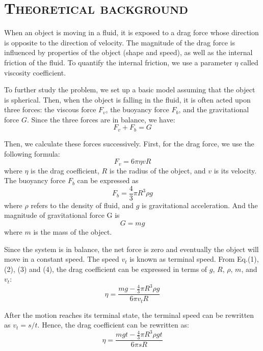 \documentclass[a4paper,12pt]{article}
\begin{document}
\section{\textsc{Theoretical background}}
When an object is moving in a fluid, it is exposed to a drag force whose direction is opposite to the direction of velocity. The magnitude of the drag force is influenced by properties of the object (shape and speed), as well as the internal friction of the fluid. To quantify the internal friction, we use a parameter $\eta$ called viscosity coefficient.
\par To further study the problem, we set up a basic model assuming that the object is spherical. Then, when the object is falling in the fluid, it is often acted upon three forces: the viscous force $F_v$, the buoyancy force $F_b$, and the gravitational force $G$. Since the three forces are in balance, we have:
\begin{equation}
F_v + F_b = G
\end{equation}
\par Then, we calculate these forces successively. First, for the drag force, we use the following formula: 
\begin{equation}
F_v = 6\pi \eta vR
\end{equation}
where $\eta$ is the drag coefficient, $R$ is the radius of the object, and $v$ is its velocity. The buoyancy force $F_b$ can be expressed as
\begin{equation}
F_b = \frac{4}{3}\pi R^3 \rho g
\end{equation}
where $\rho$ refers to the density of fluid, and $g$ is gravitational acceleration. And the magnitude of gravitational force G is
\begin{equation}
G = mg
\end{equation}
where $m$ is the mass of the object.
\par Since the system is in balance, the net force is zero and eventually the object will move in a constant speed. The speed $v_t$ is known as terminal speed. From Eq.(1), (2), (3) and (4), the drag coefficient can be expressed in terms of $g$, $R$, $\rho$, $m$, and $v_t$:
\begin{equation}
\eta = \frac{mg-\frac{4}{3}\pi R^3\rho g}{6\pi v_tR}
\end{equation}
\par After the motion reaches its terminal state, the terminal speed can be rewritten as $v_t = s/t$. Hence, the drag coefficient can be rewritten as:
\begin{equation}
\eta = \frac{mgt-\frac{4}{3}\pi R^3\rho gt}{6\pi sR}
\end{equation}
\end{document}
